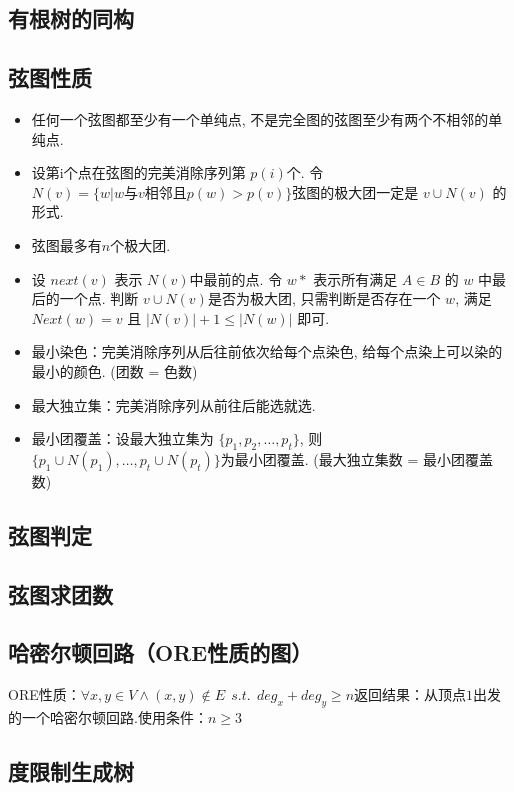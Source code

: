 \documentclass[landscape,a4paper]{article}
\begin{document}
\begin{spacing}{0.3}
\begin{multicols}{2}
	\subsection{有根树的同构}
	
	\subsection{弦图性质}
\begin{itemize}
\item 任何一个弦图都至少有一个单纯点, 不是完全图的弦图至少有两个不相邻的单纯点.
\item 设第i个点在弦图的完美消除序列第 $p(i)$个. 令 $N(v) = \{w | w \text{与} v \text{相邻且} p(w) > p(v) \}$弦图的极大团一定是 $v \cup N(v)$ 的形式.
\item 弦图最多有$n$个极大团.
\item 设 $next(v)$ 表示 $N(v)$中最前的点. 令 $w*$ 表示所有满足 $A\in B$ 的 $w$ 中最后的一个点.
  判断 $v \cup N(v)$是否为极大团,
  只需判断是否存在一个 $w$,
  满足 $Next(w) = v$ 且 $|N(v)| + 1 \le |N(w)|$ 即可.
\item 最小染色：完美消除序列从后往前依次给每个点染色, 给每个点染上可以染的最小的颜色. (团数 = 色数)
\item 最大独立集：完美消除序列从前往后能选就选.
\item 最小团覆盖：设最大独立集为 $\{p_1, p_2, \ldots, p_t\}$, 则 $\{p_1 \cup N(p_1), \ldots, p_t \cup N(p_t) \}$为最小团覆盖.  (最大独立集数 = 最小团覆盖数)
\end{itemize}
\subsection{弦图判定}

\subsection{弦图求团数}

\subsection{哈密尔顿回路（ORE性质的图）}
ORE性质：$\forall x,y \in V \wedge (x,y) \notin E \ \ s.t. \ \ deg_x+deg_y \geq n$返回结果：从顶点$1$出发的一个哈密尔顿回路.使用条件：$n \geq 3$

\subsection{度限制生成树}




\end{multicols}
\end{spacing}
\end{document}
